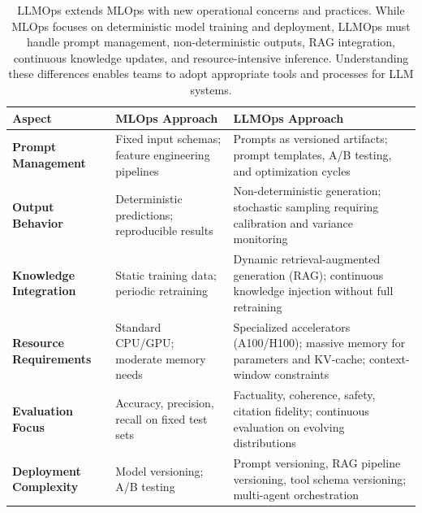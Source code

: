 \begin{table}[t]
\centering
\small
\caption{LLMOps extends MLOps with new operational concerns and practices. While MLOps focuses on deterministic model training and deployment, LLMOps must handle prompt management, non-deterministic outputs, RAG integration, continuous knowledge updates, and resource-intensive inference. Understanding these differences enables teams to adopt appropriate tools and processes for LLM systems.}
\label{tab:ch02_llmops_vs_mlops}
\setlength{\tabcolsep}{6pt}
\renewcommand{\arraystretch}{1.3}
\begin{tabularx}{\linewidth}{@{}>{\raggedright\arraybackslash}p{3.2cm}>{\raggedright\arraybackslash}X>{\raggedright\arraybackslash}X@{}}
\toprule
\rowcolor{gray!15}
\textbf{Aspect} & \textbf{MLOps Approach} & \textbf{LLMOps Approach} \\
\midrule
\textbf{Prompt Management} & Fixed input schemas; feature engineering pipelines & Prompts as versioned artifacts; prompt templates, A/B testing, and optimization cycles \parencite{Chowdhery2022palm} \\
\addlinespace[2pt]
\textbf{Output Behavior} & Deterministic predictions; reproducible results & Non-deterministic generation; stochastic sampling requiring calibration and variance monitoring \parencite{kamathDeepDive} \\
\addlinespace[2pt]
\textbf{Knowledge Integration} & Static training data; periodic retraining & Dynamic retrieval-augmented generation (RAG); continuous knowledge injection without full retraining \parencite{Borzunov2023Petals,Zheng2024sglang} \\
\addlinespace[2pt]
\textbf{Resource Requirements} & Standard CPU/GPU; moderate memory needs & Specialized accelerators (A100/H100); massive memory for parameters and KV-cache; context-window constraints \parencite{Zhang2024Coupled,Liu2023Scissorhands} \\
\addlinespace[2pt]
\textbf{Evaluation Focus} & Accuracy, precision, recall on fixed test sets & Factuality, coherence, safety, citation fidelity; continuous evaluation on evolving distributions \\
\addlinespace[2pt]
\textbf{Deployment Complexity} & Model versioning; A/B testing & Prompt versioning, RAG pipeline versioning, tool schema versioning; multi-agent orchestration \\
\bottomrule
\end{tabularx}
\end{table}


